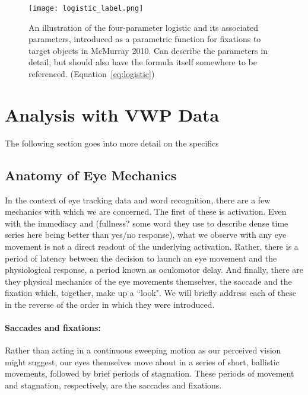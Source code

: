 \begin{figure}[h]
\centering
\texttt{[image: logistic\_label.png]}
\caption{An illustration of the four-parameter logistic and its associated parameters, introduced as a parametric function for fixations to target objects in McMurray 2010. Can describe the parameters in detail, but should also have the formula itself somewhere to be referenced. (Equation~\ref{eq:logistic})}
\label{fig:logistic_definition}
\end{figure}



\section{Analysis with VWP Data}

The following section goes into more detail on the specifics


\subsection{Anatomy of Eye Mechanics }

In the context of eye tracking data and word recognition, there are a few mechanics with which we are concerned. The first of these is activation. Even with the immediacy and (fullness? some word they use to describe dense time series here being better than yes/no response), what we observe with any eye movement is not a direct readout of the underlying activation.  Rather, there is a period of latency between the decision to launch an eye movement and the physiological response, a period known as oculomotor delay. And finally, there are they physical mechanics of the eye movements themselves, the saccade and the fixation which, together, make up a ``look". We will briefly address each of these in the reverse of the order in which they were introduced.



\paragraph{Saccades and fixations:} Rather than acting in a continuous sweeping motion as our perceived vision might suggest, our eyes themselves move about in a series of short, ballistic movements, followed by brief periods of stagnation. These periods of movement and stagnation, respectively, are the saccades and fixations. 

